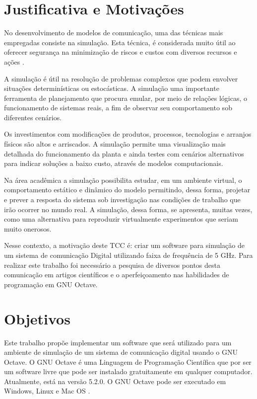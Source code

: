 \section{Justificativa e Motivações}

No desenvolvimento de modelos de comunicação, uma das técnicas mais empregadas consiste na simulação. Esta técnica, é considerada muito útil ao oferecer segurança na minimização de riscos e custos com diversos recursos e ações \cite{shannon1998introduction}.

A simulação é útil na resolução de problemas complexos que podem envolver situações determinísticas ou estocásticas. A simulação uma importante ferramenta de planejamento que procura emular, por meio de relações lógicas, o funcionamento de sistemas reais, a fim de observar seu comportamento sob diferentes cenários.

Os investimentos com modificações de produtos, processos, tecnologias e arranjos físicos são altos e arriscados. A simulação permite uma visualização mais detalhada do funcionamento da planta e ainda testes com cenários alternativos para indicar soluções a baixo custo, através de modelos computacionais.

Na área acadêmica a simulação possibilita estudar, em um ambiente virtual, o comportamento estático e dinâmico do modelo permitindo, dessa forma, projetar e prever a resposta do sistema sob investigação nas condições de trabalho que irão ocorrer no mundo real. A simulação, dessa forma, se apresenta, muitas vezes, como uma alternativa para reproduzir virtualmente experimentos que seriam muito onerosos.

Nesse contexto, a motivação deste TCC é: criar um software para simulação de um sistema de comunicação Digital utilizando faixa de frequência de 5 GHz. Para realizar este trabalho foi necessário a pesquisa de diversos pontos desta comunicação em artigos científicos e o aperfeiçoamento nas habilidades de programação em GNU Octave. 

\section{Objetivos}

Este trabalho propõe implementar um software que será utilizado para um ambiente de simulação de um sistema de comunicação digital usando o GNU Octave. O GNU Octave é uma Linguagem de Programação Científica que por ser um software livre que pode ser instalado gratuitamente em qualquer computador. Atualmente, está na versão 5.2.0. O GNU Octave pode ser executado em Windows, Linux e Mac OS \cite{octave}. 

